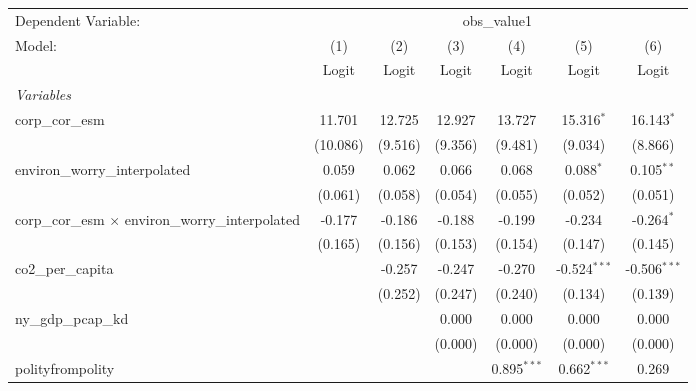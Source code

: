 
\begingroup
\centering
\begin{tabular}{lcccccc}
   \toprule
   Dependent Variable: & \multicolumn{6}{c}{obs\_value1}\\
   Model:                                                    & (1)      & (2)     & (3)     & (4)           & (5)            & (6)\\  
                                                             &  Logit   & Logit   & Logit   & Logit         & Logit          & Logit\\  
   \midrule
   \emph{Variables}\\
   corp\_cor\_esm                                            & 11.701   & 12.725  & 12.927  & 13.727        & 15.316$^{*}$   & 16.143$^{*}$\\   
                                                             & (10.086) & (9.516) & (9.356) & (9.481)       & (9.034)        & (8.866)\\   
   environ\_worry\_interpolated                              & 0.059    & 0.062   & 0.066   & 0.068         & 0.088$^{*}$    & 0.105$^{**}$\\   
                                                             & (0.061)  & (0.058) & (0.054) & (0.055)       & (0.052)        & (0.051)\\   
   corp\_cor\_esm $\times$ environ\_worry\_interpolated      & -0.177   & -0.186  & -0.188  & -0.199        & -0.234         & -0.264$^{*}$\\   
                                                             & (0.165)  & (0.156) & (0.153) & (0.154)       & (0.147)        & (0.145)\\   
   co2\_per\_capita                                          &          & -0.257  & -0.247  & -0.270        & -0.524$^{***}$ & -0.506$^{***}$\\   
                                                             &          & (0.252) & (0.247) & (0.240)       & (0.134)        & (0.139)\\   
   ny\_gdp\_pcap\_kd                                         &          &         & 0.000   & 0.000         & 0.000          & 0.000\\   
                                                             &          &         & (0.000) & (0.000)       & (0.000)        & (0.000)\\   
   polityfrompolity                                          &          &         &         & 0.895$^{***}$ & 0.662$^{***}$  & 0.269\\   

\end{tabular}
